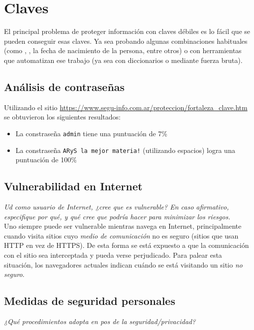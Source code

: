 \section{Claves}

El principal problema de proteger información con claves débiles es lo fácil que se pueden conseguir esas claves. Ya sea probando algunas combinaciones habituales (como , , la fecha de nacimiento de la persona, entre otros) o con herramientas que automatizan ese trabajo (ya sea con diccionarios o mediante fuerza bruta).

\subsection{Análisis de contraseñas}

Utilizando el sitio \url{https://www.segu-info.com.ar/proteccion/fortaleza_clave.htm} se obtuvieron los siguientes resultados:

\begin{itemize}
    \item La constraseña \texttt{admin} tiene una puntuación de 7\% 
    \item La constraseña \texttt{ARyS la mejor materia!} (utilizando espacios) logra una puntuación de 100\% 
\end{itemize}

\subsection{Vulnerabilidad en Internet}

\emph{Ud como usuario de Internet, ¿cree que es vulnerable? En caso afirmativo, especifique por qué, y qué cree que podría hacer para minimizar los riesgos.} 
~\\

Uno siempre puede ser vulnerable mientras navega en Internet, principalmente cuando visita sitios cuyo \emph{medio de comunicación} no es seguro (sitios que usan HTTP en vez de HTTPS). De esta forma se está expuesto a que la comunicación con el sitio sea interceptada y pueda verse perjudicado. Para palear esta situación, los navegadores actuales indican cuándo se está visitando un sitio \emph{no seguro}.  

\subsection{Medidas de seguridad personales}

\emph{¿Qué procedimientos adopta en pos de la seguridad/privacidad?} 
~\\

